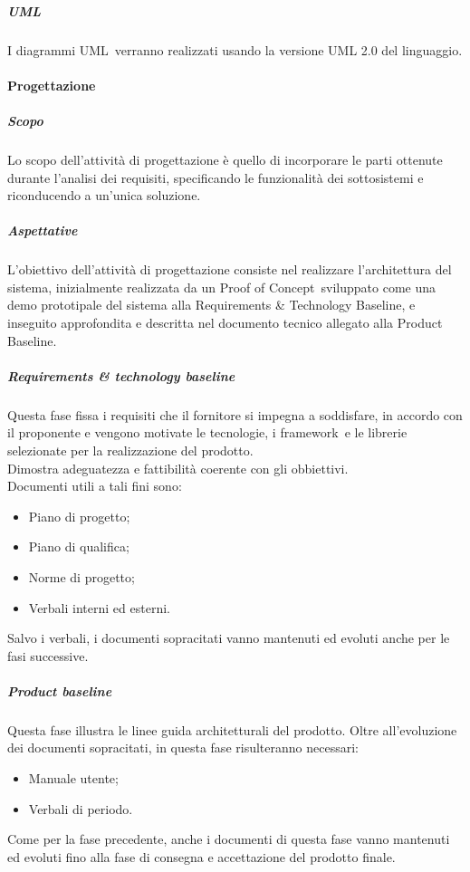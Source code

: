             \subparagraph{UML} \label{subparagraph:UML}
            I diagrammi UML\glo\ verranno realizzati usando la versione UML 2.0 del linguaggio.
          
        \paragraph{Progettazione} \label{paragraph:Progettazione}

            \subparagraph{Scopo} \label{subparagraph:Progettazione_Scopo}
            Lo scopo dell'attività di progettazione è quello di incorporare le parti ottenute durante l'analisi dei requisiti, specificando le funzionalità dei sottosistemi
            e riconducendo a un’unica soluzione. 

            \subparagraph{Aspettative} \label{subparagraph:Progettazione_Aspettative}
            L’obiettivo dell’attività di progettazione consiste nel realizzare l’architettura del sistema, inizialmente realizzata da un Proof of Concept\glo\ sviluppato come
            una demo prototipale del sistema alla Requirements \& Technology Baseline, e inseguito approfondita e descritta nel documento tecnico allegato alla Product Baseline.

            \subparagraph{Requirements \& technology baseline} \label{subparagraph:Requirements & technology baseline}
            Questa fase fissa i requisiti che il fornitore si impegna a soddisfare, in accordo con il proponente e vengono motivate le tecnologie,
            i framework\glo\ e le librerie selezionate per la realizzazione del prodotto.\\
            Dimostra adeguatezza e fattibilità coerente con gli obbiettivi.\\
            Documenti utili a tali fini sono:
            \begin{itemize}
                \item Piano di progetto;
                \item Piano di qualifica;
                \item Norme di progetto;
                \item Verbali interni ed esterni.
            \end{itemize}
            Salvo i verbali, i documenti sopracitati vanno mantenuti ed evoluti anche per le fasi successive.\\


            \subparagraph{Product baseline} \label{subparagraph:Product baseline}
            Questa fase illustra le linee guida architetturali del prodotto.
            Oltre all'evoluzione dei documenti sopracitati, in questa fase risulteranno necessari:
            \begin{itemize}
                \item Manuale utente;
                \item Verbali di periodo.
            \end{itemize}
            Come per la fase precedente, anche i documenti di questa fase vanno mantenuti ed evoluti fino alla fase di consegna e accettazione del prodotto finale.

